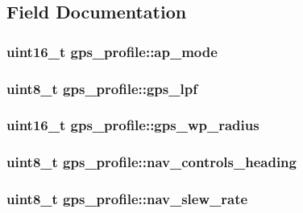 \subsection{Field Documentation}
\hypertarget{structgps__profile_a29fc311ff10040d40a79d1a2fd710cc1}{
\subsubsection[{ap\+\_\+mode}]{\setlength{\rightskip}{0pt plus 5cm}uint16\+\_\+t gps\+\_\+profile\+::ap\+\_\+mode}}\label{structgps__profile_a29fc311ff10040d40a79d1a2fd710cc1}
\hypertarget{structgps__profile_a805c7b7e12d1314f2a881ce70057ac4b}{
\subsubsection[{gps\+\_\+lpf}]{\setlength{\rightskip}{0pt plus 5cm}uint8\+\_\+t gps\+\_\+profile\+::gps\+\_\+lpf}}\label{structgps__profile_a805c7b7e12d1314f2a881ce70057ac4b}
\hypertarget{structgps__profile_abe5ed888a6001845c0a62ab73526d2b8}{
\subsubsection[{gps\+\_\+wp\+\_\+radius}]{\setlength{\rightskip}{0pt plus 5cm}uint16\+\_\+t gps\+\_\+profile\+::gps\+\_\+wp\+\_\+radius}}\label{structgps__profile_abe5ed888a6001845c0a62ab73526d2b8}
\hypertarget{structgps__profile_a42f6a83d6ca890d29ffdd3ce76d5a268}{
\subsubsection[{nav\+\_\+controls\+\_\+heading}]{\setlength{\rightskip}{0pt plus 5cm}uint8\+\_\+t gps\+\_\+profile\+::nav\+\_\+controls\+\_\+heading}}\label{structgps__profile_a42f6a83d6ca890d29ffdd3ce76d5a268}
\hypertarget{structgps__profile_ac5b538b36f8fe64e27c5006d8c29a9a7}{
\subsubsection[{nav\+\_\+slew\+\_\+rate}]{\setlength{\rightskip}{0pt plus 5cm}uint8\+\_\+t gps\+\_\+profile\+::nav\+\_\+slew\+\_\+rate}}\label{structgps__profile_ac5b538b36f8fe64e27c5006d8c29a9a7}

